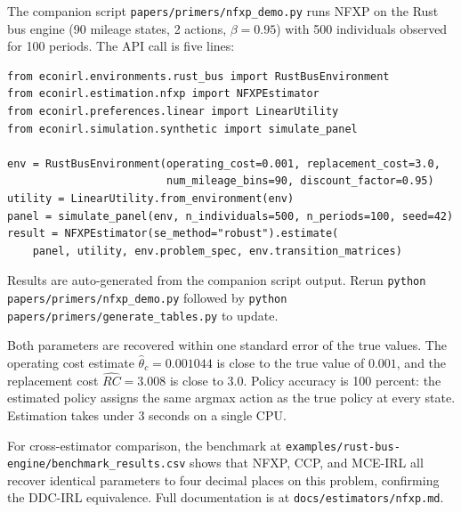 \documentclass[11pt]{article}
\begin{document}
The companion script \texttt{papers/primers/nfxp\_demo.py} runs NFXP on the Rust bus engine (90 mileage states, 2 actions, $\beta = 0.95$) with 500 individuals observed for 100 periods.
The API call is five lines:

\begin{lstlisting}
from econirl.environments.rust_bus import RustBusEnvironment
from econirl.estimation.nfxp import NFXPEstimator
from econirl.preferences.linear import LinearUtility
from econirl.simulation.synthetic import simulate_panel

env = RustBusEnvironment(operating_cost=0.001, replacement_cost=3.0,
                         num_mileage_bins=90, discount_factor=0.95)
utility = LinearUtility.from_environment(env)
panel = simulate_panel(env, n_individuals=500, n_periods=100, seed=42)
result = NFXPEstimator(se_method="robust").estimate(
    panel, utility, env.problem_spec, env.transition_matrices)
\end{lstlisting}

Results are auto-generated from the companion script output.
Rerun \texttt{python papers/primers/nfxp\_demo.py} followed by \texttt{python papers/primers/generate\_tables.py} to update.

\begin{table}[H]
\centering
\caption{NFXP-NK on the Rust bus engine (90 states, $\beta = 0.95$, 50{,}000 obs).}
\label{tab:nfxp_results}

\end{table}

Both parameters are recovered within one standard error of the true values.
The operating cost estimate $\hat\theta_c = 0.001044$ is close to the true value of $0.001$, and the replacement cost $\widehat{RC} = 3.008$ is close to $3.0$.
Policy accuracy is 100 percent: the estimated policy assigns the same argmax action as the true policy at every state.
Estimation takes under 3 seconds on a single CPU.

For cross-estimator comparison, the benchmark at \texttt{examples/rust-bus-engine/benchmark\_results.csv} shows that NFXP, CCP, and MCE-IRL all recover identical parameters to four decimal places on this problem, confirming the DDC-IRL equivalence.
Full documentation is at \texttt{docs/estimators/nfxp.md}.
\end{document}
